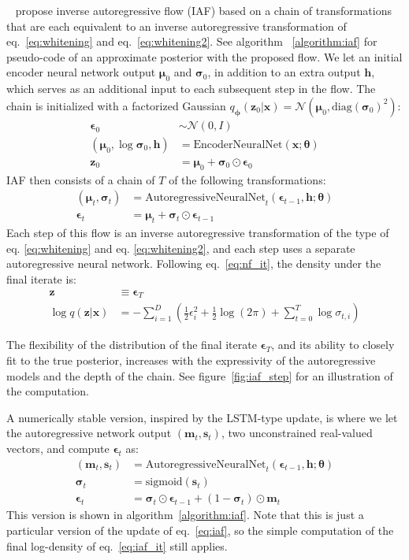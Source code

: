 \documentclass[MAL,biber]{nowfnt} %
\newcommand{\bb}[1]{\mathbf{#1}}
\newcommand{\bx}{\bb{x}}
\newcommand{\bh}{\bb{h}}
\newcommand{\bz}{\bb{z}}
\newcommand{\bT}{\boldsymbol{\theta}}
\newcommand{\bphi}{\boldsymbol{\phi}}
\newcommand{\beps}{\boldsymbol{\epsilon}}
\newcommand{\bepsilon}{\boldsymbol{\epsilon}}
\newcommand{\bsigma}{\boldsymbol{\sigma}}
\newcommand{\bmu}{\boldsymbol{\mu}}
\newcommand{\bs}{\mathbf{s}}
\newcommand{\bmm}{\mathbf{m}}
\newcommand{\qP}{q_{\bphi}}
\begin{document}
~\cite{kingma2016improving} propose inverse autoregressive flow (IAF) based on a chain of transformations that are each equivalent to an inverse autoregressive transformation of eq.~\eqref{eq:whitening} and eq.~\eqref{eq:whitening2}. See algorithm ~\ref{algorithm:iaf} for pseudo-code of an approximate posterior with the proposed flow. We let an initial encoder neural network output $\bmu_0$ and $\bsigma_0$, in addition to an extra output $\bh$, which serves as an additional input to each subsequent step in the flow. The chain is initialized with a factorized Gaussian $\qP(\bz_0|\bx) = \mathcal{N}(\bmu_0, \text{diag}(\bsigma_0)^2)$:
\begin{align}
\beps_0 &\sim \mathcal{N}(0,I)\\
(\bmu_0, \log \bsigma_0, \bh) &= \text{EncoderNeuralNet}(\bx; \bT)\\
\bz_0 &= \bmu_0 + \bsigma_0 \odot \bepsilon_0
\label{eq:transform}
\end{align}
IAF then consists of a chain of $T$ of the following transformations:
\begin{align}
(\bmu_t, \bsigma_t) &= \text{AutoregressiveNeuralNet}_t(\beps_{t-1}, \bh; \bT)\\
\beps_t &= \bmu_t + \bsigma_t \odot \beps_{t-1}
\label{eq:iaf}
\end{align}
 Each step of this flow is an inverse autoregressive transformation of the type of eq. \eqref{eq:whitening} and eq. \eqref{eq:whitening2}, and each step uses a separate autoregressive neural network. Following eq.~\eqref{eq:nf_it}, the density under the final iterate is:
\begin{align}
\bz &\equiv \beps_T\\
\log q(\bz|\bx) &= - \sum_{i=1}^D \left(\tfrac{1}{2}\epsilon_i^2 + \tfrac{1}{2}\log(2 \pi) + \sum_{t=0}^T \log \sigma_{t,i} \right)
\label{eq:iaf_it}
\end{align}

The flexibility of the distribution of the final iterate $\beps_T$, and its ability to closely fit to the true posterior, increases with the expressivity of the autoregressive models and the depth of the chain. See figure~\ref{fig:iaf_step} for an illustration of the computation.

A numerically stable version, inspired by the LSTM-type update, is where we let the autoregressive network output $(\bmm_t,\bs_t)$, two unconstrained real-valued vectors, and compute $\beps_t$ as:
\begin{align}
(\bmm_t,\bs_t) &= \text{AutoregressiveNeuralNet}_t(\beps_{t-1}, \bh; \bT)\\
\bsigma_t &= \text{sigmoid}(\bs_t)\\
\beps_t &= \bsigma_t \odot \beps_{t-1} + (1 - \bsigma_t) \odot \bmm_t
\end{align}
This version is shown in algorithm~\ref{algorithm:iaf}. Note that this is just a particular version of the update of eq.~\eqref{eq:iaf}, so the simple computation of the final log-density of eq.~\eqref{eq:iaf_it} still applies.
\end{document}
